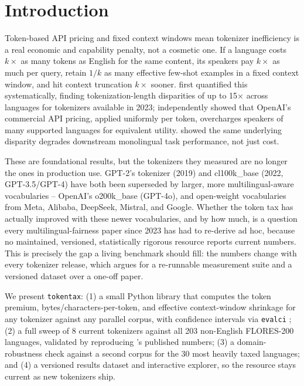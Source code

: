 \documentclass[11pt]{article}
\begin{document}
\section{Introduction}

Token-based API pricing and fixed context windows mean tokenizer
inefficiency is a real economic and capability penalty, not a cosmetic one.
If a language costs $k\times$ as many tokens as English for the same
content, its speakers pay $k\times$ as much per query, retain $1/k$ as many
effective few-shot examples in a fixed context window, and hit context
truncation $k\times$ sooner. \citet{petrov2023} first quantified this
systematically, finding tokenization-length disparities of up to 15$\times$
across languages for tokenizers available in 2023; \citet{ahia2023}
independently showed that OpenAI's commercial API pricing, applied uniformly
per token, overcharges speakers of many supported languages for equivalent
utility. \citet{rust2021} showed the same underlying disparity degrades
downstream monolingual task performance, not just cost.

These are foundational results, but the tokenizers they measured are no
longer the ones in production use. GPT-2's tokenizer (2019) and cl100k\_base
(2022, GPT-3.5/GPT-4) have both been superseded by larger, more
multilingual-aware vocabularies -- OpenAI's o200k\_base (GPT-4o), and
open-weight vocabularies from Meta, Alibaba, DeepSeek, Mistral, and Google.
Whether the token tax has actually improved with these newer vocabularies,
and by how much, is a question every multilingual-fairness paper since 2023
has had to re-derive ad hoc, because no maintained, versioned, statistically
rigorous resource reports current numbers. This is precisely the gap a
living benchmark should fill: the numbers change with every tokenizer
release, which argues for a re-runnable measurement suite and a versioned
dataset over a one-off paper.

We present \texttt{tokentax}: (1) a small Python library that computes the
token premium, bytes/characters-per-token, and effective context-window
shrinkage for any tokenizer against any parallel corpus, with confidence
intervals via \texttt{evalci} \citep{chandrahas2026evalci}; (2) a full sweep
of 8 current tokenizers against all 203 non-English FLORES-200 languages,
validated by reproducing \citeauthor{petrov2023}'s published numbers; (3) a
domain-robustness check against a second corpus for the 30 most heavily
taxed languages; and (4) a versioned results dataset and interactive
explorer, so the resource stays current as new tokenizers ship.
\end{document}

